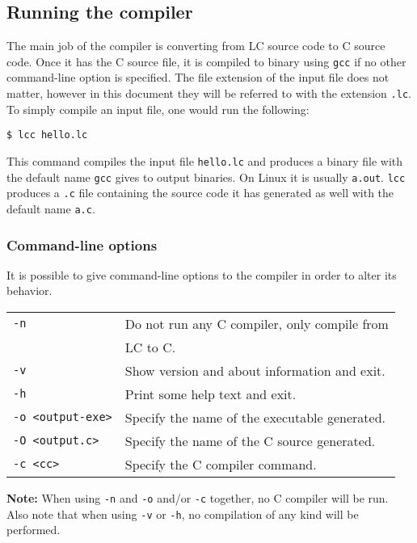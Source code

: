 \documentclass[12pt]{article}
\begin{document}
\subsection{Running the compiler}

The main job of the compiler is converting from LC source code to C source code.
Once it has the C source file, it is compiled to binary using \texttt{gcc} if no
other command-line option is specified. The file extension of the input file
does not matter, however in this document they will be referred to with the
extension \texttt{.lc}. To simply compile an input file, one would run the
following:
\begin{lstlisting}
$ lcc hello.lc
\end{lstlisting}
This command compiles the input file \texttt{hello.lc} and produces a binary
file with the default name \texttt{gcc} gives to output binaries. On Linux it is
usually \texttt{a.out}. \texttt{lcc} produces a \texttt{.c} file containing the
source code it has generated as well with the default name \texttt{a.c}.

\subsubsection{Command-line options}

It is possible to give command-line options to the compiler in order to alter
its behavior. 

\vspace{7pt}

\begin{tabular}{l l}
    \texttt{-n}\quad& Do not run any C compiler, only compile from \\ 
                    & LC to C. \\
    \texttt{-v}\quad& Show version and about information and exit. \\
    \texttt{-h}\quad& Print some help text and exit. \\
    \texttt{-o <output-exe>}\quad& Specify the name of the executable
        generated. \\
    \texttt{-O <output.c>}\quad& Specify the name of the C source generated. \\
    \texttt{-c <cc>}\quad& Specify the C compiler command.
\end{tabular}

\vspace{8pt}

\textbf{Note:} When using \texttt{-n} and \texttt{-o} and/or \texttt{-c} together,
no C compiler will be run. Also note that when using \texttt{-v} or \texttt{-h},
no compilation of any kind will be performed. 
\end{document}
